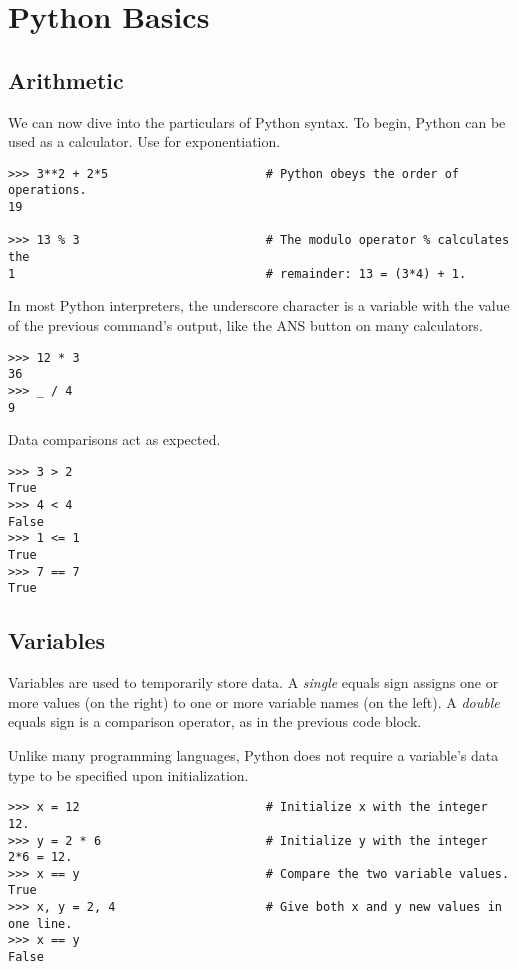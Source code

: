 
\section*{Python Basics}

\subsection*{Arithmetic}
We can now dive into the particulars of Python syntax.
To begin, Python can be used as a calculator.
Use \li{**} for exponentiation.

\begin{lstlisting}
>>> 3**2 + 2*5                      # Python obeys the order of operations.
19

>>> 13 % 3                          # The modulo operator % calculates the
1                                   # remainder: 13 = (3*4) + 1. 
\end{lstlisting}
In most Python interpreters, the underscore character \li{\_} is a variable with the value of the previous command's output, like the ANS button on many calculators.

\begin{lstlisting}
>>> 12 * 3
36
>>> _ / 4
9
\end{lstlisting}

Data comparisons act as expected.
\begin{lstlisting}
>>> 3 > 2
True
>>> 4 < 4
False
>>> 1 <= 1
True
>>> 7 == 7
True
\end{lstlisting}

\subsection*{Variables}
Variables are used to temporarily store data.
A \emph{single} equals sign assigns one or more values (on the right) to one or more variable names (on the left).
A \emph{double} equals sign is a comparison operator, as in the previous code block.

Unlike many programming languages, Python does not require a variable's data type to be specified upon initialization.

\begin{lstlisting}
>>> x = 12                          # Initialize x with the integer 12.
>>> y = 2 * 6                       # Initialize y with the integer 2*6 = 12.
>>> x == y                          # Compare the two variable values.
True
>>> x, y = 2, 4                     # Give both x and y new values in one line.
>>> x == y
False
\end{lstlisting}


